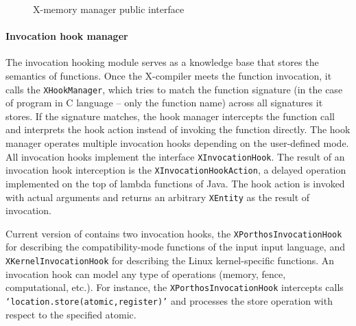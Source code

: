 \begin{figure}[h]
\centering

\caption{X-memory manager public interface}
\label{fig:mem-manager}
\end{figure}


\paragraph{Invocation hook manager}
\label{ch:impl:proc:x-compiler:hooking}



The invocation hooking module serves as a knowledge base that stores the semantics of functions.
Once the X-compiler meets the function invocation, it calls the \texttt{XHookManager}, which tries to match the function signature (in the case of program in C language -- only the function name) across all signatures it stores.
If the signature matches, the hook manager intercepts the function call and interprets the hook action instead of invoking the function directly.
The hook manager operates multiple invocation hooks depending on the user-defined mode.
All invocation hooks implement the interface \texttt{XInvocationHook}.
The result of an invocation hook interception is the \texttt{XInvocationHookAction}, a delayed operation implemented on the top of lambda functions of Java.
The hook action is invoked with actual arguments and returns an arbitrary \texttt{XEntity} as the result of invocation.

Current version of \porthos[2] contains two invocation hooks, the \texttt{XPorthosInvocationHook} for describing the compatibility-mode functions of the input \porthos[2] input language, and \texttt{XKernelInvocationHook} for describing the Linux kernel-specific functions.
An invocation hook can model any type of operations (memory, fence, computational, etc.).
For instance, the \texttt{XPorthosInvocationHook} intercepts calls \texttt{`location.store(atomic,register)'} and processes the store operation with respect to the specified atomic.


